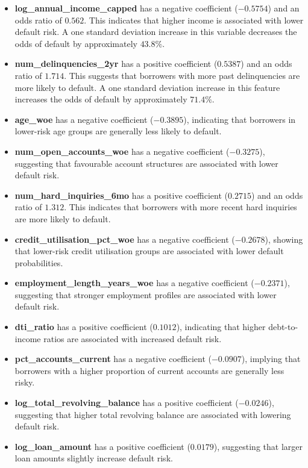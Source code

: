 \documentclass[
  letterpaper,
  DIV=11,
  numbers=noendperiod]{scrartcl}
\begin{document}
\begin{itemize}

    \item \textbf{log\_annual\_income\_capped} has a negative coefficient ($-0.5754$) and an odds ratio of $0.562$. This indicates that higher income is associated with lower default risk. A one standard deviation increase in this variable decreases the odds of default by approximately $43.8\%$.

    \item \textbf{num\_delinquencies\_2yr} has a positive coefficient ($0.5387$) and an odds ratio of $1.714$. This suggests that borrowers with more past delinquencies are more likely to default. A one standard deviation increase in this feature increases the odds of default by approximately $71.4\%$.

    \item \textbf{age\_woe} has a negative coefficient ($-0.3895$), indicating that borrowers in lower-risk age groups are generally less likely to default.

    \item \textbf{num\_open\_accounts\_woe} has a negative coefficient ($-0.3275$), suggesting that favourable account structures are associated with lower default risk.

    \item \textbf{num\_hard\_inquiries\_6mo} has a positive coefficient ($0.2715$) and an odds ratio of $1.312$. This indicates that borrowers with more recent hard inquiries are more likely to default.

    \item \textbf{credit\_utilisation\_pct\_woe} has a negative coefficient ($-0.2678$), showing that lower-risk credit utilisation groups are associated with lower default probabilities.

    \item \textbf{employment\_length\_years\_woe} has a negative coefficient ($-0.2371$), suggesting that stronger employment profiles are associated with lower default risk.

    \item \textbf{dti\_ratio} has a positive coefficient ($0.1012$), indicating that higher debt-to-income ratios are associated with increased default risk.

    \item \textbf{pct\_accounts\_current} has a negative coefficient ($-0.0907$), implying that borrowers with a higher proportion of current accounts are generally less risky.

    \item \textbf{log\_total\_revolving\_balance} has a positive coefficient ($-0.0246$), suggesting that higher total revolving balance are associated with lowering default risk.

    \item \textbf{log\_loan\_amount} has a positive coefficient ($0.0179$), suggesting that larger loan amounts slightly increase default risk.

\end{itemize}
\end{document}
